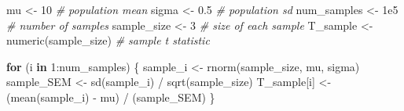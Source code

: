 \documentclass[
  11pt,
  a4paper,
]{book}
\newenvironment{Shaded}{\begin{snugshade}}{\end{snugshade}}
\newcommand{\CommentTok}[1]{\textcolor[rgb]{0.56,0.35,0.01}{\textit{#1}}}
\newcommand{\ControlFlowTok}[1]{\textcolor[rgb]{0.13,0.29,0.53}{\textbf{#1}}}
\newcommand{\DecValTok}[1]{\textcolor[rgb]{0.00,0.00,0.81}{#1}}
\newcommand{\FloatTok}[1]{\textcolor[rgb]{0.00,0.00,0.81}{#1}}
\newcommand{\FunctionTok}[1]{\textcolor[rgb]{0.00,0.00,0.00}{#1}}
\newcommand{\NormalTok}[1]{#1}
\newcommand{\OtherTok}[1]{\textcolor[rgb]{0.56,0.35,0.01}{#1}}
\newcommand{\SpecialCharTok}[1]{\textcolor[rgb]{0.00,0.00,0.00}{#1}}
\begin{document}
\begin{Shaded}
\begin{Highlighting}[]
\NormalTok{mu }\OtherTok{\textless{}{-}} \DecValTok{10} \CommentTok{\# population mean}
\NormalTok{sigma }\OtherTok{\textless{}{-}} \FloatTok{0.5} \CommentTok{\# population sd}
\NormalTok{num\_samples }\OtherTok{\textless{}{-}} \FloatTok{1e5} \CommentTok{\# number of samples}
\NormalTok{sample\_size }\OtherTok{\textless{}{-}} \DecValTok{3} \CommentTok{\# size of each sample}
\NormalTok{T\_sample }\OtherTok{\textless{}{-}} \FunctionTok{numeric}\NormalTok{(sample\_size) }\CommentTok{\# sample t statistic}

\ControlFlowTok{for}\NormalTok{ (i }\ControlFlowTok{in} \DecValTok{1}\SpecialCharTok{:}\NormalTok{num\_samples) \{}
\NormalTok{  sample\_i }\OtherTok{\textless{}{-}} \FunctionTok{rnorm}\NormalTok{(sample\_size, mu, sigma)}
\NormalTok{  sample\_SEM }\OtherTok{\textless{}{-}} \FunctionTok{sd}\NormalTok{(sample\_i) }\SpecialCharTok{/} \FunctionTok{sqrt}\NormalTok{(sample\_size)}
\NormalTok{  T\_sample[i] }\OtherTok{\textless{}{-}}\NormalTok{ (}\FunctionTok{mean}\NormalTok{(sample\_i) }\SpecialCharTok{{-}}\NormalTok{ mu) }\SpecialCharTok{/}\NormalTok{ (sample\_SEM)}
\NormalTok{\}}


\end{Highlighting}
\end{Shaded}
\end{document}

